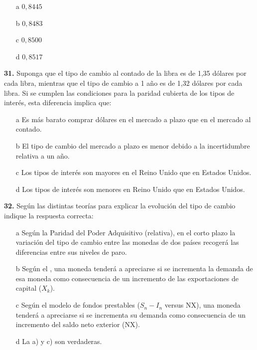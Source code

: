 \documentclass{nuevotema}
\begin{document}
\begin{itemize}
	\item[a] $0,8445$
	\item[b] $0,8483$
	\item[c] $0,8500$
	\item[d] $0,8517$
\end{itemize}

\textbf{31.} Suponga que el tipo de cambio al contado de la libra es de 1,35 dólares por cada libra, mientras que el tipo de cambio a 1 año es de 1,32 dólares por cada libra. Si se cumplen las condiciones para la paridad cubierta de los tipos de interés, esta diferencia implica que:

\begin{itemize}
	\item[a] Es más barato comprar dólares en el mercado a plazo que en el mercado al contado.
	\item[b] El tipo de cambio del mercado a plazo es menor debido a la incertidumbre relativa a un año.
	\item[c] Los tipos de interés son mayores en el Reino Unido que en Estados Unidos.
	\item[d] Los tipos de interés son menores en Reino Unido que en Estados Unidos.
\end{itemize}


\textbf{32.} Según las distintas teorías para explicar la evolución del tipo de cambio indique la respuesta correcta:

\begin{enumerate}
	\item[a] Según la Paridad del Poder Adquisitivo (relativa), en el corto plazo la variación del tipo de cambio entre las monedas de dos países recogerá las diferencias entre sus niveles de paro.
	\item[b] Según el , una moneda tenderá a apreciarse si se incrementa la demanda de esa moneda como consecuencia de un incremento de las exportaciones de capital ($X_k$).
	\item[c] Según el modelo de fondos prestables ($S_n - I_n$ versus NX), una moneda tenderá a apreciarse si se incrementa su demanda como consecuencia de un incremento del saldo neto exterior (NX).
	\item[d] La a) y c) son verdaderas.
\end{enumerate}

\end{document}
